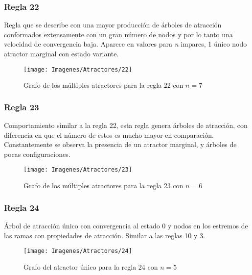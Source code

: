 \documentclass[]{article}
\begin{document}
			
			\newpage
			\subsubsection{Regla 22}
				\justifying
				Regla que se describe con una mayor producción de árboles de atracción conformados extensamente con un gran número de nodos y por lo tanto una velocidad de convergencia baja. Aparece en valores para \textit{n} impares, 1 único nodo atractor marginal con estado variante.
				
				\hfill\break
				\hfill\break
				\hfill\break
				\begin{figure}[!h]
					\centering
					\texttt{[image: Imagenes/Atractores/22]}
					\caption{Grafo de los múltiples atractores para la regla 22 con $n=7$}
					\label{Regla_22}
				\end{figure}
				
			
			\newpage
			\subsubsection{Regla 23}
				\justifying	
				Comportamiento similar a la regla 22, esta regla genera árboles de atracción, con diferencia en que el número de estos es mucho mayor en comparación. Constantemente se observa la presencia de un atractor marginal, y árboles de pocas configuraciones.
				
				\hfill\break
				\hfill\break
				\hfill\break
				\begin{figure}[!h]
					\centering
					\texttt{[image: Imagenes/Atractores/23]}
					\caption{Grafo de los múltiples atractores para la regla 23 con $n=6$}
					\label{Regla_23}
				\end{figure}
				
				
			\newpage
			\subsubsection{Regla 24}
				\justifying	
				Árbol de atracción único con convergencia al estado 0 y nodos en los estremos de las ramas con propiedades de atracción. Similar a las reglas 10 y 3.
				
				\hfill\break
				\hfill\break
				\hfill\break
				\begin{figure}[!h]
					\centering
					\texttt{[image: Imagenes/Atractores/24]}
					\caption{Grafo del atractor único para la regla 24 con $n=5$}
					\label{Regla_24}
				\end{figure}
				
\end{document}
